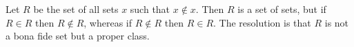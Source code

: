 Let $R$ be the set of all sets $x$ such that $x \notin x$. Then $R$ is a set of sets, but if $R \in R$ then $R \notin R$, whereas if $R \notin R$ then $R \in R$. The resolution is that $R$ is not a bona fide set but a proper class.

